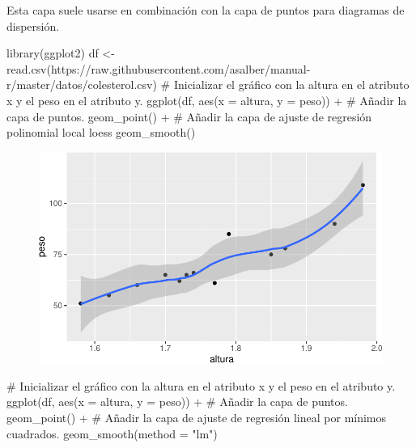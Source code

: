 \documentclass[
  a4paper,
]{scrreport}
\newenvironment{Shaded}{\begin{snugshade}}{\end{snugshade}}
\newcommand{\AttributeTok}[1]{\textcolor[rgb]{0.40,0.45,0.13}{#1}}
\newcommand{\CommentTok}[1]{\textcolor[rgb]{0.37,0.37,0.37}{#1}}
\newcommand{\FunctionTok}[1]{\textcolor[rgb]{0.28,0.35,0.67}{#1}}
\newcommand{\NormalTok}[1]{\textcolor[rgb]{0.00,0.23,0.31}{#1}}
\newcommand{\OtherTok}[1]{\textcolor[rgb]{0.00,0.23,0.31}{#1}}
\newcommand{\SpecialCharTok}[1]{\textcolor[rgb]{0.37,0.37,0.37}{#1}}
\newcommand{\StringTok}[1]{\textcolor[rgb]{0.13,0.47,0.30}{#1}}
\theoremstyle{definition}
\theoremstyle{definition}
\theoremstyle{remark}
\begin{document}
Esta capa suele usarse en combinación con la capa de puntos para
diagramas de dispersión.

\begin{Shaded}
\begin{Highlighting}[]
\FunctionTok{library}\NormalTok{(ggplot2)}
\NormalTok{df }\OtherTok{\textless{}{-}} \FunctionTok{read.csv}\NormalTok{(}\StringTok{\textquotesingle{}https://raw.githubusercontent.com/asalber/manual{-}r/master/datos/colesterol.csv\textquotesingle{}}\NormalTok{)}
\CommentTok{\# Inicializar el gráfico con la altura en el atributo x y el peso en el atributo y.}
\FunctionTok{ggplot}\NormalTok{(df, }\FunctionTok{aes}\NormalTok{(}\AttributeTok{x =}\NormalTok{ altura, }\AttributeTok{y =}\NormalTok{ peso)) }\SpecialCharTok{+}
\CommentTok{\# Añadir la capa de puntos.}
    \FunctionTok{geom\_point}\NormalTok{() }\SpecialCharTok{+}
\CommentTok{\# Añadir la capa de ajuste de regresión polinomial local loess}
    \FunctionTok{geom\_smooth}\NormalTok{()}
\end{Highlighting}
\end{Shaded}

\begin{figure}[H]

{\centering \includegraphics{07-graficos_files/figure-pdf/unnamed-chunk-24-1.pdf}

}

\end{figure}

\begin{Shaded}
\begin{Highlighting}[]
\CommentTok{\# Inicializar el gráfico con la altura en el atributo x y el peso en el atributo y.}
\FunctionTok{ggplot}\NormalTok{(df, }\FunctionTok{aes}\NormalTok{(}\AttributeTok{x =}\NormalTok{ altura, }\AttributeTok{y =}\NormalTok{ peso)) }\SpecialCharTok{+}
\CommentTok{\# Añadir la capa de puntos.}
    \FunctionTok{geom\_point}\NormalTok{() }\SpecialCharTok{+}
\CommentTok{\# Añadir la capa de ajuste de regresión lineal por mínimos cuadrados.}
    \FunctionTok{geom\_smooth}\NormalTok{(}\AttributeTok{method =} \StringTok{"lm"}\NormalTok{)}
\end{Highlighting}
\end{Shaded}
\end{document}
